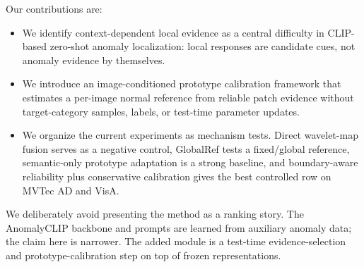 Our contributions are:
\begin{itemize}
  \item We identify context-dependent local evidence as a central difficulty in
  CLIP-based zero-shot anomaly localization: local responses are candidate
  cues, not anomaly evidence by themselves.
  \item We introduce an image-conditioned prototype calibration framework that
  estimates a per-image normal reference from reliable patch evidence without
  target-category samples, labels, or test-time parameter updates.
  \item We organize the current experiments as mechanism tests. Direct
  wavelet-map fusion serves as a negative control, GlobalRef tests a fixed/global
  reference, semantic-only prototype adaptation is a strong
  baseline, and boundary-aware reliability plus conservative calibration gives
  the best controlled row on MVTec AD and VisA.
\end{itemize}

We deliberately avoid presenting the method as a ranking story. The
AnomalyCLIP backbone and prompts are learned from auxiliary anomaly data; the
claim here is narrower. The added module is a test-time evidence-selection and
prototype-calibration step on top of frozen representations.
